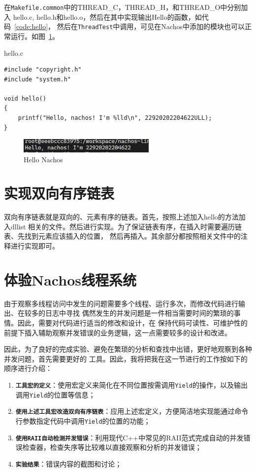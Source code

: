 \documentclass[a4paper,twoside]{article}
\begin{document}
\begin{spacing}{1.2}
在\texttt{Makefile.common}中的THREAD\_C，THREAD\_H，和THREAD\_O中分别加入
hello.c, hello.h和hello.o，然后在其中实现输出Hello的函数，如代码~\ref{code:hello}，
然后在\texttt{ThreadTest}中调用，可见在Nachos中添加的模块也可以正常运行。如图~\ref{fig:hello}。
\begin{listing}[htb]
	\caption{hello.c}
	\label{code:hello}
	\begin{verbatim}
#include "copyright.h"
#include "system.h"

void hello()
{
    printf("Hello, nachos! I'm %lld\n", 22920202204622ULL);
}
	\end{verbatim}
\end{listing}
\begin{figure}[H]
	\centering
	\includegraphics[width=0.6\textwidth]{images/hello.png}
	\caption{Hello Nachos}
	\label{fig:hello}
\end{figure}

\section{实现双向有序链表}

双向有序链表就是双向的、元素有序的链表。首先，按照上述加入hello的方法加入dllist
相关的文件。然后进行实现。为了保证链表有序，在插入时需要遍历链表、先找到元素应该插入的位置，
然后再插入。其余部分都按照相关文件中的注释进行实现即可。


\section{体验Nachos线程系统}

由于观察多线程访问中发生的问题需要多个线程、运行多次，而修改代码进行输出、在较多的日志中寻找
偶然发生的并发问题是一件相当需要时间的繁琐的事情。因此，需要对代码进行适当的修改和设计，在
保持代码可读性、可维护性的前提下插入辅助观察并发错误的业务逻辑，这一点需要较多的设计和改进。

因此，为了良好的完成实验、避免在繁琐的分析和查找中出错，更好地观察到各种并发问题，首先需要更好的
工具。因此，我将把我在这一节进行的工作按如下的顺序进行介绍：

\begin{enumerate}
	\item \texttt{\textbf{工具宏的定义}}：使用宏定义来简化在不同位置按需调用\texttt{Yield}的操作，以及输出调用\texttt{Yield}的位置等信息；
	\item \texttt{\textbf{使用上述工具宏改造双向有序链表}}：应用上述宏定义，方便简洁地实现能通过命令行参数指定代码中调用\texttt{Yield}的位置的功能；
	\item \texttt{\textbf{使用RAII自动检测并发错误}}：利用现代C++中常见的RAII范式完成自动的并发错误检查器，检查失序等比较难以直接观察和分析的并发错误；
	\item \texttt{\textbf{实验结果}}：错误内容的截图和讨论；
\end{enumerate}


\end{spacing}
\end{document}
